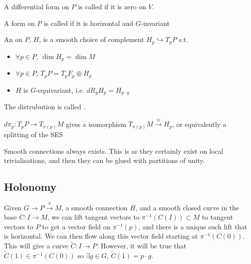 \documentclass{article}
\begin{document}
\begin{definition}
	A differential form on $P$ is called  if it is zero on $V$. 
\end{definition}

\begin{definition}
	A form on $P$ is called  if it is horizontal and $G$-invariant 
\end{definition}

\begin{definition}
An  on $P$, $H$, is a smooth choice of complement $H_p \hookrightarrow T_pP$ s.t. 
\begin{itemize}
    \item $\forall p \in P, \, \dim H_p = \dim M$ 
    \item $\forall p \in P, \, T_pP = T_p F_p \oplus H_p$
    \item $H$ is $G$-equivariant, i.e. $dR_g H_p = H_{p \cdot g}$
\end{itemize}
The distrubution is called .
\end{definition}

\begin{remark}
$d\pi_p : T_p P \to T_{\pi(p)}M$ gives a isomorphism $T_{\pi(p)} M \overset{\cong}{\to} H_p$, or equivalently a splitting of the SES
\end{remark}

\begin{remark}
Smooth connections always exists. This is as they certainly exist on local trivialisations, and then they can be glued with partitions of unity. 
\end{remark}



\subsection{Holonomy}
Given $G \to P \overset{\pi}{\to} M$, a smooth connection $H$, and a smooth closed curve in the base $C: I \to M$, we can lift tangent vectors to $\pi^{-1}(C(I)) \subset M$ to tangent vectors to $P$ to get a vector field on $\pi^{-1}(p)$, and there is a unique such lift that is horizontal. We can then flow along this vector field starting at $\pi^{-1}(C(0))$. This will give a curve $\tilde{C}:I \to P$. However, it will be true that $\tilde{C}(1) \in \pi^{-1}(C(0))$ so $\exists g \in G, \, \tilde{C}(1) = p \cdot g$. 
\end{document}
